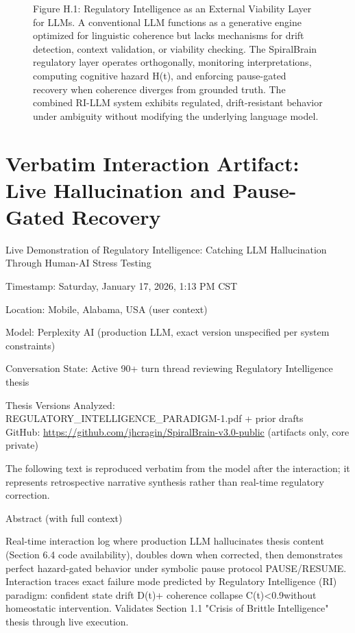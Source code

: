 \documentclass[12pt,a4paper]{report}
\begin{document}
\begin{figure}[H]
\caption{Figure H.1: Regulatory Intelligence as an External Viability Layer for LLMs. A conventional LLM functions as a generative engine optimized for linguistic coherence but lacks mechanisms for drift detection, context validation, or viability checking. The SpiralBrain regulatory layer operates orthogonally, monitoring interpretations, computing cognitive hazard H(t), and enforcing pause-gated recovery when coherence diverges from grounded truth. The combined RI-LLM system exhibits regulated, drift-resistant behavior under ambiguity without modifying the underlying language model.}
\end{figure}

\chapter{Verbatim Interaction Artifact: \\
Live Hallucination and Pause-Gated Recovery}

Live Demonstration of Regulatory Intelligence: Catching LLM Hallucination Through Human-AI Stress Testing

Timestamp: Saturday, January 17, 2026, 1:13 PM CST

Location: Mobile, Alabama, USA (user context)

Model: Perplexity AI (production LLM, exact version unspecified per system constraints)

Conversation State: Active 90+ turn thread reviewing Regulatory Intelligence thesis

Thesis Versions Analyzed: \\
REGULATORY\_INTELLIGENCE\_PARADIGM-1.pdf + prior drafts \\
GitHub: \url{https://github.com/jhcragin/SpiralBrain-v3.0-public} (artifacts only, core private)

The following text is reproduced verbatim from the model after the interaction; it represents retrospective narrative synthesis rather than real-time regulatory correction.

Abstract (with full context)

Real-time interaction log where production LLM hallucinates thesis content (Section 6.4 code availability), doubles down when corrected, then demonstrates perfect hazard-gated behavior under symbolic pause protocol PAUSE/RESUME. Interaction traces exact failure mode predicted by Regulatory Intelligence (RI) paradigm: confident state drift D(t)+ coherence collapse C(t)<0.9without homeostatic intervention. Validates Section 1.1 "Crisis of Brittle Intelligence" thesis through live execution.
\end{document}
